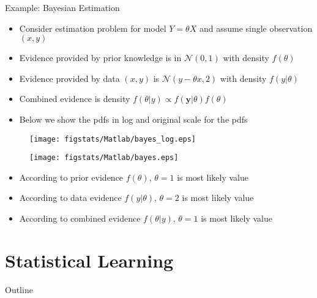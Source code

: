 \documentclass[9pt]{beamer}
\begin{document}
%
\begin{frame}{Example: Bayesian Estimation}

\begin{itemize}
\item Consider estimation problem for model $Y=\theta X$ and assume single observation $(x,y)$
\item Evidence provided by prior knowledge is in $\mathcal{N}(0,1)$ with density $f(\theta)$
\item Evidence provided by data $(x,y)$ is $\mathcal{N}(y-\theta x,2)$ with density $f(y|\theta)$
\item Combined evidence is density $f(\theta|y)\propto f(\mathbf{y}|\theta)f(\theta)$
\item Below we show the pdfs in log and original scale for the pdfs
\end{itemize}

\begin{figure}[!htb]
    \centering
	\texttt{[image: figstats/Matlab/bayes\_log.eps]}
\end{figure}

\begin{figure}[!htb]
    \centering
	\texttt{[image: figstats/Matlab/bayes.eps]}
\end{figure}

\begin{itemize}
\item According to prior evidence $f(\theta)$, $\theta=1$ is most likely value
\item According to data evidence $f(y|\theta)$, $\theta=2$ is most likely value 
\item According to combined evidence $f(\theta|y)$, $\theta=1$ is most likely value 
\end{itemize}

\end{frame}

\section{Statistical Learning}
\begin{frame}{Outline}
\tableofcontents[currentsection]
\end{frame}
\end{document}
